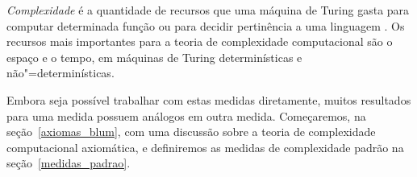 \emph{Complexidade} é a quantidade de recursos
que uma máquina de Turing gasta
para computar determinada função
ou para decidir pertinência a uma linguagem
\cite[p.~285]{HopcroftUllman1979}.
Os recursos mais importantes para a teoria de complexidade computacional
são o espaço e o tempo,
em máquinas de Turing determinísticas e não"=determinísticas.

Embora seja possível trabalhar com estas medidas diretamente,
muitos resultados para uma medida
possuem análogos em outra medida.
Começaremos,
na seção~\ref{axiomas_blum},
com uma discussão sobre a teoria de complexidade computacional axiomática,
e definiremos as medidas de complexidade padrão na seção~\ref{medidas_padrao}.
